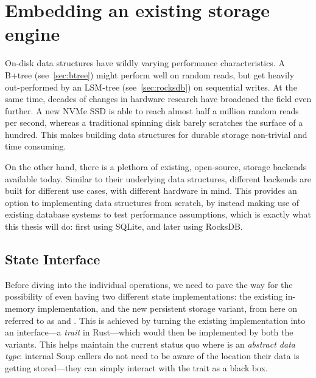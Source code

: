 \section{Embedding an existing storage engine}
On-disk data structures have wildly varying performance characteristics. A
B+tree (see~\ref{sec:btree}) might perform well on random reads, but get heavily
out-performed by an LSM-tree (see~\ref{sec:rocksdb}) on sequential writes. At
the same time, decades of changes in hardware research have broadened the field
even further. A new NVMe SSD is able to reach almost half a million random reads
per
second,
whereas a traditional spinning disk barely scratches the surface of a
hundred.
This makes building data structures for durable storage non-trivial and time
consuming.

On the other hand, there is a plethora of existing, open-source, storage
backends available today. Similar to their underlying data structures, different
backends are built for different use cases, with different hardware in mind.
This provides an option to implementing data structures from scratch, by instead
making use of existing database systems to test performance assumptions, which
is exactly what this thesis will do: first using SQLite, and later using
RocksDB.\@

\subsection{State Interface}\label{sec:trait}
Before diving into the individual  operations, we need to pave the
way for the possibility of even having two different state implementations: the
existing in-memory implementation, and the new persistent storage variant, from
here on referred to as  and . This is
achieved by turning the existing  implementation into an
interface---a \textit{trait} in Rust---which would then be implemented by both
the  variants. This helps maintain the current status quo where
 is an \textit{abstract data type}: internal Soup callers do not
need to be aware of the location their data is getting stored---they can simply
interact with the  trait as a black box\@.


